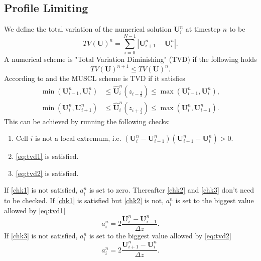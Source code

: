 \documentclass[a4paper, oneside]{discothesis}
\begin{document}
\subsection{Profile Limiting} \label{ssec:pl}
We define the total variation of the numerical solution $\mathbf{U}_i^n$ at timestep $n$ to be 
\begin{equation}
	TV(\mathbf{U})^n = \sum_{i=0}^{N-1} | \mathbf{U}_{i+1}^n - \mathbf{U}_{i}^n|.
\end{equation}
A numerical scheme is "Total Variation Diminishing" (TVD) if the following holds
\begin{equation}
	TV(\mathbf{U})^{n+1} \leq TV(\mathbf{U})^n.
\end{equation}
According to \cite{van1977towards} and \cite{colella1984piecewise} the MUSCL scheme is TVD if it satisfies
\begin{align}
	\min (\mathbf{U}_{i-1}^n, \mathbf{U}_i^n) &\leq \mathbf{\hat{U}}_i^n(z_{i-\frac{1}{2}}) \leq \max (\mathbf{U}_{i-1}^n, \mathbf{U}_i^n), \label{eq:tvd1}\\
	\min (\mathbf{U}_{i}^n, \mathbf{U}_{i+1}^n) &\leq \mathbf{\hat{U}}_i^n(z_{i+\frac{1}{2}}) \leq \max (\mathbf{U}_{i}^n, \mathbf{U}_{i+1}^n).\label{eq:tvd2}
\end{align}
This can be achieved by running the following checks:
\begin{enumerate}
	\item Cell $i$ is not a local extremum, i.e. $(\mathbf{U}_i^n - \mathbf{U}_{i-1}^n)(\mathbf{U}_{i+1}^n-\mathbf{U}_i^n) > 0$. \label{chk1}
	\item \autoref{eq:tvd1} is satisfied. \label{chk2}
	\item \autoref{eq:tvd2} is satisfied. \label{chk3}
\end{enumerate}
If \autoref{chk1} is not satisfied, $a_i^n$ is set to zero.
Thereafter \autoref{chk2} and \autoref{chk3} don't need to be checked.
If \autoref{chk1} is satisfied but \autoref{chk2} is not, $a_i^n$ is set to the biggest value allowed by \autoref{eq:tvd1}
\begin{equation}
	a_i^n = 2 \frac{\mathbf{U}_i^n - \mathbf{U}_{i-1}^n}{\Delta z}.
\end{equation}
If \autoref{chk3} is not satisfied, $a_i^n$ is set to the biggest value allowed by \autoref{eq:tvd2}
\begin{equation}
	a_i^n = 2 \frac{\mathbf{U}_{i+1}^n - \mathbf{U}_{i}^n}{\Delta z}.
\end{equation}
\end{document}
